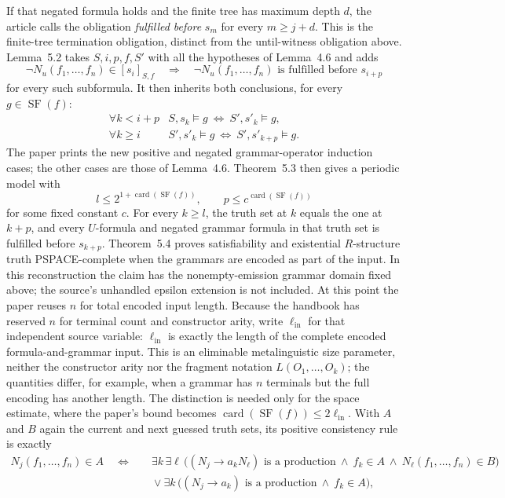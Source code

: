 If that negated formula holds and the finite tree has maximum depth \(d\), the
article calls the obligation \emph{fulfilled before} \(s_m\) for every
\(m\ge j+d\).  This is the finite-tree termination obligation, distinct from
the until-witness obligation above.  Lemma~5.2 takes \(S,i,p,f,S'\) with all
the hypotheses of Lemma~4.6 and adds
\[
 \neg N_u(f_1,\ldots,f_n)\in[s_i]_{S,f}
 \quad\Longrightarrow\quad
 \neg N_u(f_1,\ldots,f_n)\text{ is fulfilled before }s_{i+p}
\]
for every such subformula.  It then inherits both conclusions, for every
\(g\in\operatorname{SF}(f)\):
\[
\begin{array}{ll}
 \forall k<i+p&
 S,s_k\models g\ \Longleftrightarrow\ S',s'_k\models g,\\
 \forall k\ge i&
 S',s'_k\models g\ \Longleftrightarrow\ S',s'_{k+p}\models g.
\end{array}
\]
The paper prints the new positive and negated grammar-operator induction
cases; the other cases are those of Lemma~4.6.  Theorem~5.3 then gives
a periodic model with
\[
 l\le 2^{1+\operatorname{card}(\operatorname{SF}(f))},
 \qquad
 p\le c^{\operatorname{card}(\operatorname{SF}(f))}
\]
for some fixed constant \(c\).  For every \(k\ge l\), the truth set at \(k\)
equals the one at \(k+p\), and every \(U\)-formula and negated grammar formula
in that truth set is fulfilled before \(s_{k+p}\).
Theorem~5.4 proves satisfiability and existential \(R\)-structure truth
PSPACE-complete when the grammars are encoded as part of the input.  In this
reconstruction the claim has the nonempty-emission grammar domain fixed above;
the source's unhandled epsilon extension is not included.  At this point the
paper reuses \(n\) for total encoded input length.  Because the handbook has
reserved \(n\) for terminal count and constructor arity, write
\(\ell_{\mathrm{in}}\) for that independent source variable:
\(\ell_{\mathrm{in}}\) is exactly the length of the complete encoded
formula-and-grammar input.  This is an eliminable metalinguistic size
parameter, neither the constructor arity nor the fragment notation
\(L(O_1,\ldots,O_k)\); the quantities differ, for example, when a grammar has
\(n\) terminals but the full encoding has another length.  The distinction is
needed only for the space estimate, where the paper's bound becomes
\(\operatorname{card}(\operatorname{SF}(f))\le2\ell_{\mathrm{in}}\).
With \(A\) and \(B\)
again the current and next guessed truth sets, its positive consistency rule
is exactly
\[
\begin{split}
 N_j(f_1,\ldots,f_n)\in A
 \quad\Longleftrightarrow\quad
 &\exists k\,\exists\ell\,
   \bigl((N_j\to a_kN_\ell)\text{ is a production}\ \land\
         f_k\in A\ \land\ N_\ell(f_1,\ldots,f_n)\in B\bigr)\\
 &{}\lor
 \exists k\,
   \bigl((N_j\to a_k)\text{ is a production}\ \land\ f_k\in A\bigr),
\end{split}
\]
